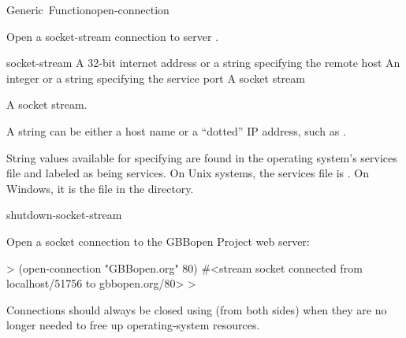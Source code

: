 \documentclass[10pt,twoside,english,pdftex]{article}
\begin{document}
\begin{functiondoc}{Generic~Function}{open-connection}{
  \returns{} }
%
%
%

\fnsyntax

\fnpurpose Open a socket-stream connection to server .

\fnmethods
{}

\fnpackage {}

\fnmodule {}

\fnargs
\begin{args}{socket-stream}
\arg[host] A 32-bit internet address or a string specifying the remote host
\arg[port] An integer or a string specifying the service port
 A socket stream
\end{args}

\fnreturns A socket stream.

\fndescription A  string can be either a host name or a
``dotted'' IP address, such as .

String values available for specifying  are found in the operating
system's services file and labeled as being  services. On Unix
systems, the services file is . On Windows, it is
the file  in the  directory.

\begin{alsos}{shutdown-socket-stream}
\end{alsos}

\fnexample
Open a socket connection to the GBBopen Project web server:
%
\W\supp
\begin{example}
  > (open-connection "GBBopen.org" 80)
  #<stream socket connected from localhost/51756 to gbbopen.org/80>
  >
\end{example}

\fnnote Connections should always be closed using  (from
both sides) when they are no longer needed to free up operating-system
resources.

\end{functiondoc}
\end{document}
